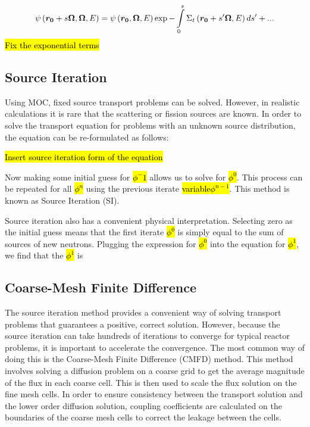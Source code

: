 \begin{gather}\label{e:MOCflatsource}
\psi\left(\bm {r_0} + s\bm\Omega,\bm\Omega,E\right) = \psi\left(\bm {r_0},\bm\Omega,E\right)\exp{-\intop_0^s \Sigma_t\left(\bm {r_0} + s'\bm\Omega,E\right)ds'} + ...
\end{gather}
\hl{Fix the exponential terms}

\subsection{Source Iteration}

Using MOC, fixed source transport problems can be solved.  However, in realistic calculations it is rare that the scattering or fission sources are known.  In order to solve the transport equation for problems with an unknown source distribution, the equation can be re-formulated as follows:

\hl{Insert source iteration form of the equation}

Now making some initial guess for \hl{$\phi^-1$} allows us to solve for \hl{$\phi^0$}.  This process can be repeated for all \hl{$\phi^n$} using the previous iterate \hl{variable$\phi^{n-1}$}.  This method is known as Source Iteration (SI).

Source iteration also has a convenient physical interpretation.  Selecting zero as the initial guess means that the first iterate \hl{$\phi^0$} is simply equal to the sum of sources of new neutrons.  Plugging the expression for \hl{$\phi^0$} into the equation for \hl{$\phi^1$}, we find that the \hl{$\phi^1$} is 

\subsection{Coarse-Mesh Finite Difference}

The source iteration method provides a convenient way of solving transport problems that guarantees a positive, correct solution.  However, because the source iteration can take hundreds of iterations to converge for typical reactor problems, it is important to accelerate the convergence.  The most common way of doing this is the Coarse-Mesh Finite Difference (CMFD) method.  This method involves solving a diffusion problem on a coarse grid to get the average magnitude of the flux in each coarse cell.  This is then used to scale the flux solution on the fine mesh cells.  In order to ensure consistency between the transport solution and the lower order diffusion solution, coupling coefficients are calculated on the boundaries of the coarse mesh cells to correct the leakage between the cells.

